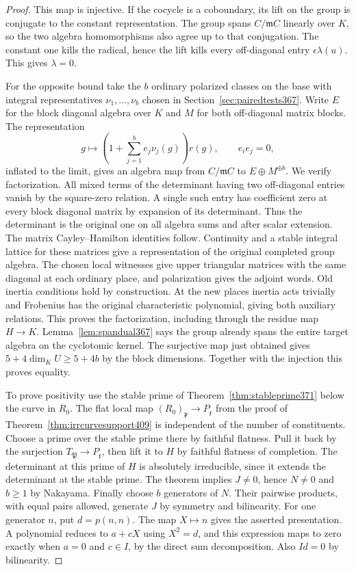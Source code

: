 \documentclass[a4paper,11pt]{article}
\theoremstyle{definition}
\theoremstyle{remark}
\numberwithin{equation}{section}
\begin{document}
\begin{proof}
This map is injective. If the cocycle is a coboundary, its
lift on the group is conjugate to the constant representation.
The group spans \(C/\mathfrak m C\) linearly over \(K\),
so the two algebra homomorphisms also agree up to that
conjugation. The constant one kills the radical, hence the
lift kills every off-diagonal entry \(\epsilon\lambda(u)\).
This gives \(\lambda=0\).

For the opposite bound take the \(b\) ordinary polarized
classes on the base with integral representatives
\(\nu_1,\ldots,\nu_b\) chosen in
Section~\ref{sec:pairedtests367}. Write \(E\) for the
block diagonal algebra over \(K\) and \(M\) for both
off-diagonal matrix blocks. The representation
\[
                 g\longmapsto
                 \left(1+\sum_{j=1}^b e_j\nu_j(g)\right)r(g),
                 \qquad e_i e_j=0 ,
\]
inflated to the limit, gives an algebra map from
\(C/\mathfrak m C\) to \(E\oplus M^{\oplus b}\). We verify
factorization. All mixed terms of the determinant having
two off-diagonal entries vanish by the square-zero relation.
A single such entry has coefficient zero at every block
diagonal matrix by expansion of its determinant. Thus the
determinant is the original one on all algebra sums and
after scalar extension. The matrix Cayley--Hamilton identities
follow. Continuity and a stable integral lattice for these
matrices give a representation of the original completed
group algebra. The chosen local witnesses give upper
triangular matrices with the same diagonal at each ordinary
place, and polarization gives the adjoint words. Old inertia
conditions hold by construction. At the new places inertia
acts trivially and Frobenius has the original characteristic
polynomial, giving both auxiliary relations. This proves the
factorization, including through the residue map \(H\to K\).
Lemma~\ref{lem:spandual367} says the group already spans
the entire target algebra on the cyclotomic kernel. The
surjective map just obtained gives
\(5+4\dim_K U\ge 5+4b\) by the block dimensions. Together
with the injection this proves equality.

To prove positivity use the stable prime of
Theorem~\ref{thm:stableprime371} below the curve in \(R_0\).
The flat local map \((R_0)_{\mathfrak p}\to P_{\mathfrak x}\)
from the proof of Theorem~\ref{thm:irrcurvesupport409}
is independent of the number of constituents. Choose a
prime over the stable prime there by faithful flatness.
Pull it back by the surjection \(T_{\mathfrak P}\to P_{\mathfrak x}\),
then lift it to \(H\) by faithful flatness of completion.
The determinant at this prime of \(H\) is absolutely
irreducible, since it extends the determinant at the stable
prime. The theorem implies \(J\ne0\), hence \(N\ne0\) and
\(b\ge1\) by Nakayama. Finally choose \(b\) generators of
\(N\). Their pairwise products, with equal pairs allowed,
generate \(J\) by symmetry and bilinearity. For one generator
\(n\), put \(d=p(n,n)\). The map \(X\mapsto n\) gives
the asserted presentation. A polynomial reduces to \(a+cX\)
using \(X^2=d\), and this expression maps to zero exactly
when \(a=0\) and \(c\in I\), by the direct sum decomposition.
Also \(Id=0\) by bilinearity.
\end{proof}
\end{document}
